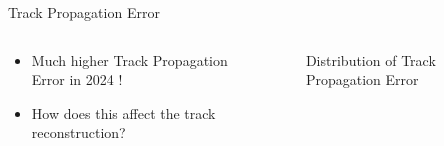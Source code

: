 \begin{frame}{Track Propagation Error}
    \begin{columns}
        \begin{column}{0.3 \linewidth}
            \begin{itemize}
                \item Much higher Track Propagation Error in 2024 !
                \item How does this affect the track reconstruction?
            \end{itemize}
        \end{column}
    \begin{column}{0.8 \linewidth}
        \begin{figure}
            \caption{Distribution of Track Propagation Error}
        \end{figure}
    \end{column}
    \end{columns}
\end{frame}